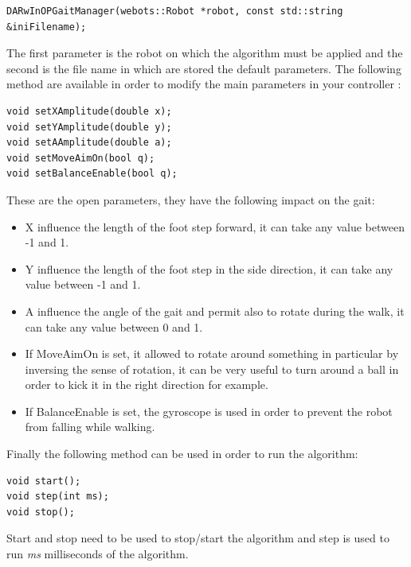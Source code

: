 \documentclass[a4paper, 12pt]{article}  		%
\begin{document}
\lstset{language=c++} 
\lstset{commentstyle=\textit} 
\begin{lstlisting} 
DARwInOPGaitManager(webots::Robot *robot, const std::string &iniFilename);
\end{lstlisting}

The first parameter is the robot on which the algorithm must be applied and the second is the file name in which are stored the default parameters. The following method are available in order to modify the main parameters in your controller :\\

\lstset{language=c++} 
\lstset{commentstyle=\textit} 
\begin{lstlisting} 
void setXAmplitude(double x);
void setYAmplitude(double y);
void setAAmplitude(double a);
void setMoveAimOn(bool q);
void setBalanceEnable(bool q);
\end{lstlisting}

These are the open parameters, they have the following impact on the gait:\\
\begin{itemize}
\item X influence the length of the foot step forward, it can take any value between -1 and 1.
\item Y influence the length of the foot step in the side direction, it can take any value between -1 and 1.
\item A influence the angle of the gait and permit also to rotate during the walk, it can take any value between 0 and 1.
\item If MoveAimOn is set, it allowed to rotate around something in particular by inversing the sense of rotation, it can be very useful to turn around a ball in order to kick it in the right direction for example.
\item If BalanceEnable is set, the gyroscope is used in order to prevent the robot from falling while walking.
\end{itemize}

Finally the following method can be used in order to run the algorithm:\\
\lstset{language=c++} 
\lstset{commentstyle=\textit} 
\begin{lstlisting} 
void start();
void step(int ms);
void stop();
\end{lstlisting}
Start and stop need to be used to stop/start the algorithm and step is used to run \textit{ms} milliseconds of the algorithm.\\
\end{document}
